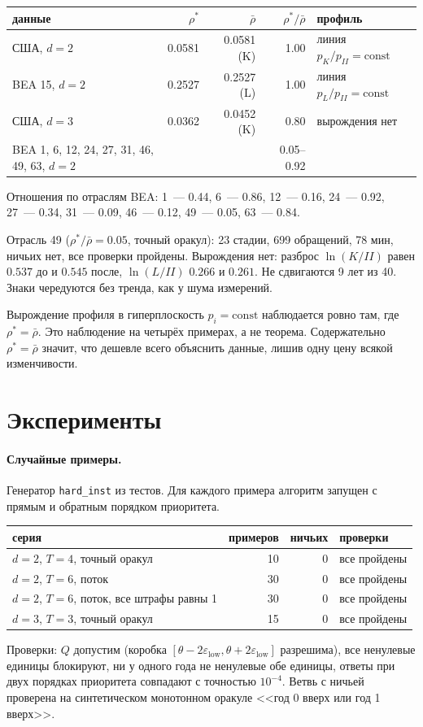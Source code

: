 \documentclass[a4paper,11pt]{article}
\theoremstyle{plain}
\theoremstyle{definition}
\theoremstyle{remark}
\begin{document}
\begin{center}
\begin{tabular}{lrrrl}
    \toprule
    данные & $\rho^*$ & $\bar\rho$ & $\rho^*/\bar\rho$ & профиль \\
    \midrule
    США, $d=2$ & 0.0581 & 0.0581 (K) & 1.00 & линия $p_K/p_{II}=\mathrm{const}$ \\
    BEA 15, $d=2$ & 0.2527 & 0.2527 (L) & 1.00 & линия $p_L/p_{II}=\mathrm{const}$ \\
    США, $d=3$ & 0.0362 & 0.0452 (K) & 0.80 & вырождения нет \\
    BEA 1, 6, 12, 24, 27, 31, 46, 49, 63, $d=2$ & & & 0.05--0.92 & \\
    \bottomrule
\end{tabular}
\end{center}
Отношения по отраслям BEA: 1~--- 0.44, 6~--- 0.86, 12~--- 0.16, 24~--- 0.92, 27~--- 0.34, 31~--- 0.09, 46~--- 0.12, 49~--- 0.05, 63~--- 0.84.

Отрасль 49 ($\rho^*/\bar\rho=0.05$, точный оракул): 23 стадии, 699 обращений, 78 мин, ничьих нет, все проверки пройдены. Вырождения нет: разброс $\ln(K/II)$ равен $0.537$ до и $0.545$ после, $\ln(L/II)$ $0.266$ и $0.261$. Не сдвигаются 9 лет из 40. Знаки чередуются без тренда, как у шума измерений.

Вырождение профиля в гиперплоскость $p_i=\mathrm{const}$ наблюдается ровно там, где $\rho^*=\bar\rho$. Это наблюдение на четырёх примерах, а не теорема. Содержательно $\rho^*=\bar\rho$ значит, что дешевле всего объяснить данные, лишив одну цену всякой изменчивости.

\section{Эксперименты}

\paragraph{Случайные примеры.} Генератор \texttt{hard\_inst} из тестов. Для каждого примера алгоритм запущен с прямым и обратным порядком приоритета.
\begin{center}
\begin{tabular}{lrrl}
    \toprule
    серия & примеров & ничьих & проверки \\
    \midrule
    $d=2$, $T=4$, точный оракул & 10 & 0 & все пройдены \\
    $d=2$, $T=6$, поток & 30 & 0 & все пройдены \\
    $d=2$, $T=6$, поток, все штрафы равны 1 & 30 & 0 & все пройдены \\
    $d=3$, $T=3$, точный оракул & 15 & 0 & все пройдены \\
    \bottomrule
\end{tabular}
\end{center}
Проверки: $Q$ допустим (коробка $[\theta-2\varepsilon_{\mathrm{low}},\theta+2\varepsilon_{\mathrm{low}}]$ разрешима), все ненулевые единицы блокируют, ни у одного года не ненулевые обе единицы, ответы при двух порядках приоритета совпадают с точностью $10^{-4}$. Ветвь с ничьей проверена на синтетическом монотонном оракуле <<год 0 вверх или год 1 вверх>>.
\end{document}
